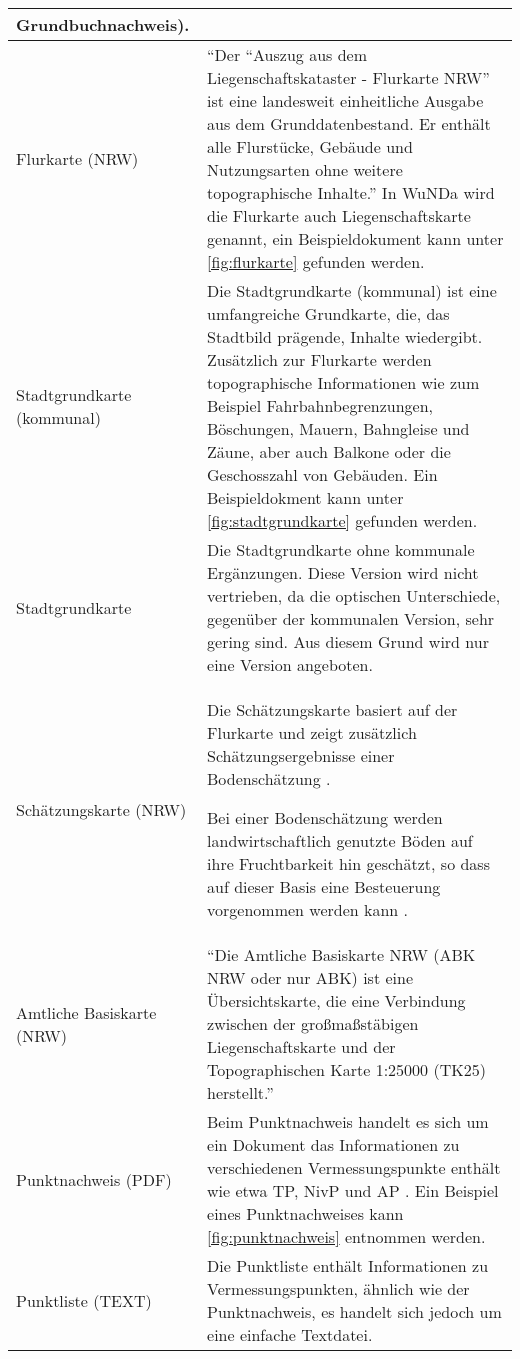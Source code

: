 \begin{longtable}{|p{}|p{}|}
{	Grundbuchnachweis).} \autocite[269]{adv-alkis-erlaeuterung}\\
	\hline
	Flurkarte (NRW)
	&
	\enquote{Der "`Auszug aus dem Liegenschaftskataster - Flurkarte NRW"'  ist eine landesweit einheitliche Ausgabe aus dem Grunddatenbestand. Er enthält alle Flurstücke, Gebäude und Nutzungsarten ohne weitere topographische Inhalte.} \autocite{wupp-alkis} In \acs{WuNDa} wird die Flurkarte auch Liegenschaftskarte genannt, ein Beispieldokument kann unter \ref{fig:flurkarte} gefunden werden.\\
	\hline
	Stadtgrundkarte (kommunal)
	&
Die Stadtgrundkarte (kommunal) ist eine umfangreiche Grundkarte, die, das Stadtbild prägende, Inhalte wiedergibt. Zusätzlich zur Flurkarte werden topographische Informationen wie zum Beispiel 
Fahrbahnbegrenzungen, Böschungen, Mauern, Bahngleise und Zäune, aber auch Balkone oder die Geschosszahl von Gebäuden.	
 \autocite[vgl.][]{wupp-alkis} Ein Beispieldokment kann unter \vref{fig:stadtgrundkarte} gefunden werden. \\
	\hline			
	Stadtgrundkarte
	&
	Die Stadtgrundkarte ohne kommunale Ergänzungen. Diese Version wird nicht vertrieben, da die optischen Unterschiede, gegenüber der kommunalen Version, sehr gering sind. Aus diesem Grund wird nur eine Version angeboten.  \\
	\hline
	Schätzungskarte (NRW)
	&
	Die Schätzungskarte basiert auf der Flurkarte und zeigt zusätzlich Schätzungsergebnisse einer Bodenschätzung \autocite[vgl.][]{gg-schaetzungskarte}. 
	
	Bei einer Bodenschätzung werden landwirtschaftlich genutzte Böden auf ihre Fruchtbarkeit hin geschätzt, so dass auf dieser Basis eine Besteuerung vorgenommen werden kann \autocite[vgl.][]{sachsen-boden}.   \\
						
	\hline
	Amtliche Basiskarte (NRW)
	&
	\enquote{Die Amtliche Basiskarte NRW (ABK NRW oder nur ABK) ist eine Übersichtskarte, die eine Verbindung zwischen der großmaßstäbigen Liegenschaftskarte und der Topographischen Karte 1:25000 (TK25) herstellt.} \autocite{wiki-abk} \\
	\hline
	Punktnachweis (PDF)
	&
	Beim Punktnachweis handelt es sich um ein Dokument das Informationen zu verschiedenen Vermessungspunkte enthält wie etwa \ac{TP}, \ac{NivP} und \ac{AP} \autocite[vgl.][]{innen-punkte}. Ein Beispiel eines Punktnachweises kann \ref{fig:punktnachweis} entnommen werden.	 \\
	\hline
	Punktliste (TEXT)
	&
	Die Punktliste enthält Informationen zu Vermessungspunkten, ähnlich wie der Punktnachweis, es handelt sich jedoch um eine einfache Textdatei. \\
	\hline
\end{longtable} 
\label{tab-alkis-standard-end}
	
